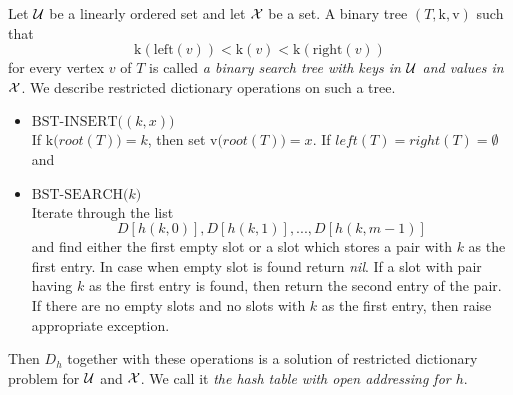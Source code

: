 \begin{definition}
Let ${\mathcal U}$ be a linearly ordered set and let ${\mathcal X}$ be a set. A binary tree $(T,\mathrm{k},\mathrm{v})$ such that 
$$\mathrm{k}(\mathrm{left}(v)) < \mathrm{k}(v) < \mathrm{k}(\mathrm{right}(v))$$
for every vertex $v$ of $T$ is called \textit{a binary search tree with keys in ${\mathcal U}$ and values in ${\mathcal X}$}. We describe restricted dictionary operations on such a tree.
\begin{itemize}
\item[] $\textrm{BST-INSERT}\big((k,x)\big)$\\
If $\mathrm{k}\big(root(T)\big) = k$, then set $\mathrm{v}\big(root(T)\big) = x$. If $left(T) = right(T) =\emptyset$ and   
\item[] $\textrm{BST-SEARCH}\big(k\big)$\\
Iterate through the list
$$D[h(k,0)], D[h(k,1)],...,D[h(k,m-1)]$$
and find either the first empty slot or a slot which stores a pair with $k$ as the first entry. In case when empty slot is found return \textit{nil}. If a slot with pair having $k$ as the first entry is found, then return the second entry of the pair. If there are no empty slots and no slots with $k$ as the first entry, then raise appropriate exception.
\end{itemize}
Then $D_h$ together with these operations is a solution of restricted dictionary problem for ${\mathcal U}$ and ${\mathcal X}$. We call it \textit{the hash table with open addressing for $h$}.
\end{definition}




















\small



